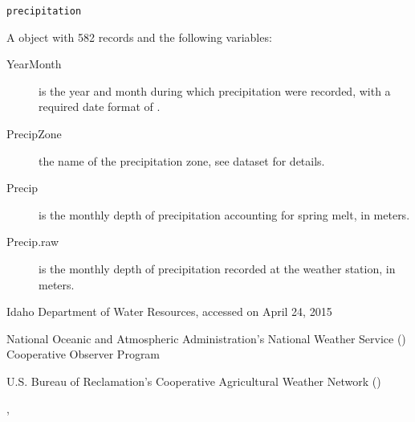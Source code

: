 \documentclass[letterpaper]{book}
\begin{document}
%
\begin{Usage}
\begin{verbatim}
precipitation
\end{verbatim}
\end{Usage}
%
\begin{Format}
A  object with 582 records and the following variables:
\begin{description}

\item[YearMonth] is the year and month during which precipitation were recorded, with a required date format of .
\item[PrecipZone] the name of the precipitation zone, see  dataset for details.
\item[Precip] is the monthly depth of precipitation accounting for spring melt, in meters.
\item[Precip.raw] is the monthly depth of precipitation recorded at the weather station, in meters.

\end{description}

\end{Format}
%
\begin{Source}\relax
Idaho Department of Water Resources, accessed on April 24, 2015
\end{Source}
%
\begin{References}\relax
National Oceanic and Atmospheric Administration's National Weather Service () Cooperative Observer Program

U.S. Bureau of Reclamation's Cooperative Agricultural Weather Network ()
\end{References}
%
\begin{SeeAlso}\relax
{}, 
\end{SeeAlso}
%
\begin{Examples}
\end{Examples}
\end{document}
